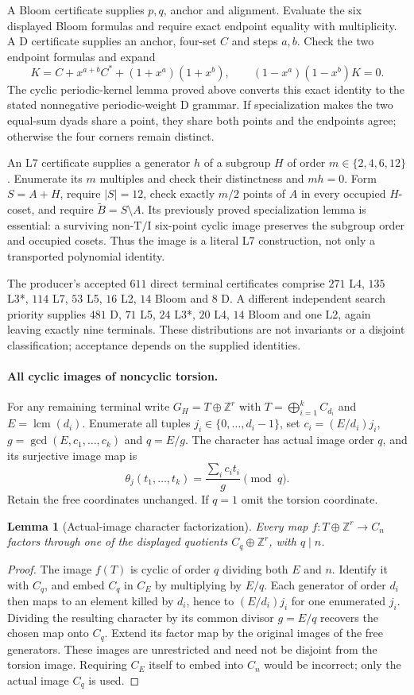 \documentclass[11pt]{article}
\newtheorem{lemma}[theorem]{Lemma}
\theoremstyle{remark}
\newcommand{\Z}{\mathbb Z}
\newcommand{\TI}{\mathrm{T/I}}
\begin{document}
A Bloom certificate supplies $p,q$, anchor and alignment. Evaluate the
six displayed Bloom formulas and require exact endpoint equality with
multiplicity. A D certificate supplies an anchor, four-set $C$ and steps
$a,b$. Check the two endpoint formulas and expand
\[
 K=C+x^{a+b}C^*+(1+x^a)(1+x^b),\qquad
 (1-x^a)(1-x^b)K=0.
\]
The cyclic periodic-kernel lemma proved above converts this exact identity
to the stated nonnegative periodic-weight D grammar. If specialization
makes the two equal-sum dyads share a point, they share both points and
the endpoints agree; otherwise the four corners remain distinct.

An L7 certificate supplies a generator $h$ of a subgroup $H$ of order
$m\in\{2,4,6,12\}$. Enumerate its $m$ multiples and check their
distinctness and $mh=0$. Form $S=A+H$, require $|S|=12$, check exactly
$m/2$ points of $A$ in every occupied $H$-coset, and require
$\widetilde B=S\setminus A$. Its previously proved specialization
lemma is essential: a surviving non-$\TI$ six-point cyclic image
preserves the subgroup order and occupied cosets. Thus the image is a
literal L7 construction, not only a transported polynomial identity.

The producer's accepted $611$ direct terminal certificates comprise
$271$ L4, $135$ L3*, $114$ L7, $53$ L5, $16$ L2, $14$ Bloom and $8$ D.
A different independent search priority supplies $481$ D, $71$ L5,
$24$ L3*, $20$ L4, $14$ Bloom and one L2, again leaving exactly nine
terminals. These distributions are not invariants or a disjoint
classification; acceptance depends on the supplied identities.

\paragraph{All cyclic images of noncyclic torsion.}
For any remaining terminal write $G_H=T\oplus\Z^r$ with
$T=\bigoplus_{i=1}^k C_{d_i}$ and $E=\operatorname{lcm}(d_i)$.
Enumerate all tuples $j_i\in\{0,\ldots,d_i-1\}$, set
$c_i=(E/d_i)j_i$, $g=\gcd(E,c_1,\ldots,c_k)$ and $q=E/g$.
The character has actual image order $q$, and its surjective image map is
\[
 \theta_j(t_1,\ldots,t_k)=
 \frac{\sum_i c_it_i}{g}\pmod q.
\]
Retain the free coordinates unchanged. If $q=1$ omit the torsion coordinate.

\begin{lemma}[Actual-image character factorization]
Every map $f:T\oplus\Z^r\to C_n$ factors through one of the displayed
quotients $C_q\oplus\Z^r$, with $q\mid n$.
\end{lemma}
\begin{proof}
The image $f(T)$ is cyclic of order $q$ dividing both $E$ and $n$.
Identify it with $C_q$, and embed $C_q$ in $C_E$ by multiplying by
$E/q$. Each generator of order $d_i$ then maps to an element killed by
$d_i$, hence to $(E/d_i)j_i$ for one enumerated $j_i$. Dividing the
resulting character by its common divisor $g=E/q$ recovers the chosen
map onto $C_q$. Extend its factor map by the original images of the free
generators. These images are unrestricted and need not be disjoint from
the torsion image. Requiring $C_E$ itself to embed into $C_n$ would be
incorrect; only the actual image $C_q$ is used.
\end{proof}
\end{document}
